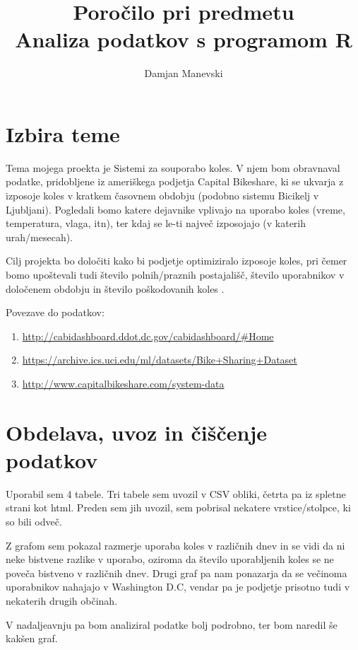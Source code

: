 \documentclass[11pt,a4paper]{article}
\begin{document}
\title{Poročilo pri predmetu \\
Analiza podatkov s programom R}
\author{Damjan Manevski}
\maketitle

\section{Izbira teme}

  Tema mojega proekta je  Sistemi za souporabo koles. V njem bom obravnaval podatke, pridobljene iz ameriškega podjetja Capital Bikeshare, ki se ukvarja z izposoje koles v kratkem časovnem obdobju (podobno sistemu Bicikelj v Ljubljani). Pogledali bomo katere dejavnike vplivajo na uporabo koles (vreme, temperatura, vlaga, itn), ter kdaj se le-ti največ izposojajo (v katerih urah/mesecah).
  
  Cilj projekta bo določiti kako bi podjetje optimiziralo izposoje koles, pri čemer bomo upoštevali tudi število polnih/praznih postajališč, število uporabnikov v določenem obdobju in število poškodovanih koles .
  
  Povezave do podatkov:
  
\begin{enumerate}

\item{\url{http://cabidashboard.ddot.dc.gov/cabidashboard/#Home}}

\item{\url{https://archive.ics.uci.edu/ml/datasets/Bike+Sharing+Dataset}}

\item{\url{http://www.capitalbikeshare.com/system-data}}

\end{enumerate}

\section{Obdelava, uvoz in čiščenje podatkov}

Uporabil sem 4 tabele. Tri tabele sem uvozil v CSV obliki, četrta pa iz spletne strani kot html. Preden sem jih uvozil, sem pobrisal nekatere vrstice/stolpce, ki so bili odveč.

Z grafom sem pokazal razmerje uporaba koles v različnih dnev in se vidi da ni neke bistvene razlike v uporabo, oziroma da število uporabljenih koles se ne poveča bistveno v različnih dnev. Drugi graf pa nam ponazarja da se večinoma uporabnikov nahajajo v Washington D.C, vendar pa je podjetje prisotno tudi v nekaterih drugih občinah.

V nadaljeavnju pa bom analiziral podatke bolj podrobno, ter bom naredil še kakšen graf.




% 
% 
\end{document}
